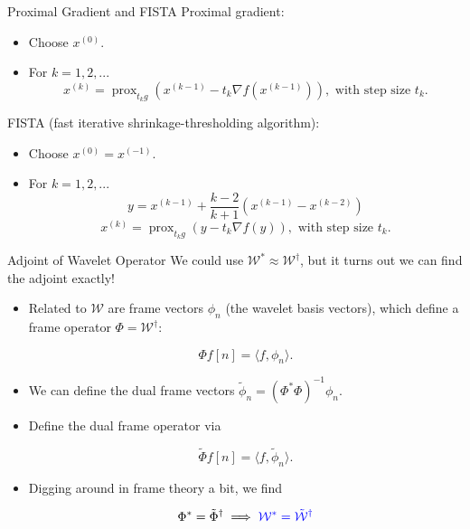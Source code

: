 \documentclass[xcolor=dvipsnames,t]{beamer} %
\begin{document}
\begin{frame}{Proximal Gradient and FISTA}
   Proximal gradient:\\
   \begin{itemize}
      \item Choose $x^{(0)}$.
      \item For $k=1,2,...$\\[-1em]

         \[ x^{(k)} = \operatorname{prox}_{t_k g}\left(x^{(k-1)} - t_k\nabla f(x^{(k-1)})\right), \text{ with step size $t_k$.} \] 
   \end{itemize} 

   FISTA (fast iterative shrinkage-thresholding algorithm):\\
   \begin{itemize}
      \item Choose $x^{(0)}=x^{(-1)}$.
      \item For $k=1,2,...$\\[-1em]
         \[ y = x^{(k-1)} + \dfrac{k-2}{k+1}\left(x^{(k-1)}-x^{(k-2)}\right) \] 
         \[ x^{(k)} = \operatorname{prox}_{t_kg}\left(y - t_k\nabla f(y)\right), \text{ with step size $t_k$.} \] 
   \end{itemize}

\end{frame}


\begin{frame}{Adjoint of Wavelet Operator}
   We could use $\mathcal{W}^\ast \approx \mathcal{W}^\dagger$, but it turns out we can find the adjoint exactly!\\
   
   \begin{itemize}
      \item Related to $\mathcal{W}$ are frame vectors $\phi_n$ (the wavelet basis vectors), which define a frame operator $\Phi=\mathcal{W}^\dagger$:

         \[ \Phi f[n] = \langle f, \phi_n\rangle. \] 
      \item We can define the dual frame vectors $\tilde{\phi}_n=\left(\Phi^\ast\Phi\right)^{-1}\phi_n$.
      \item Define the dual frame operator via

         \[ \tilde{\Phi}f[n] = \langle f, \tilde{\phi}_n\rangle. \] 

      \item Digging around in frame theory a bit, we find

         \[ \Phi^\ast = \tilde{\Phi}^\dagger \implies {\color{blue}\mathcal{W}^\ast = \tilde{\mathcal{W}}^\dagger}\] 
   \end{itemize}

\end{frame}
\end{document}
